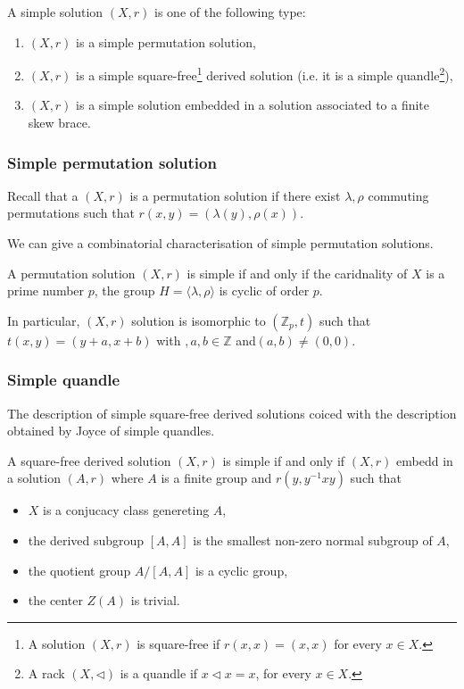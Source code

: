 \begin{theorem}
    A simple solution $(X,r)$ is one of the following type:
    \begin{enumerate}
        \item $(X,r)$ is a simple permutation solution,
        \item $(X,r)$ is a simple square-free\footnote{A solution $(X,r)$ is square-free if $r(x,x)=(x,x)$ for every $x\in X$.} derived solution (i.e. it is a simple quandle\footnote{A rack $(X,\triangleleft)$ is a quandle if $x\triangleleft x = x$, for every $x\in X$.}),
        \item $(X,r)$ is a simple solution embedded in a solution associated to a finite skew brace. 
    \end{enumerate}
\end{theorem}

\subsubsection{Simple permutation solution}

Recall that a $(X,r)$ is a permutation solution if there exist $\lambda,\rho$ commuting permutations such that $r(x,y)=(\lambda(y),\rho(x))$.

We can give a combinatorial characterisation of simple permutation solutions.

\begin{proposition}
    A permutation solution $(X,r)$ is simple if and only if the caridnality of $X$ is a prime number $p$, the group $H=\langle\lambda,\rho\rangle$ is cyclic of order $p$.

    In particular, $(X,r)$ solution is isomorphic to $(\mathbb{Z}_p,t)$ such that $t(x,y)= (y+a,x+b)$ with $,a,b\in \mathbb{Z}$ and$(a,b)\neq (0,0)$.
\end{proposition}

\subsubsection{Simple quandle}

The description of simple square-free derived solutions coiced with the description obtained by Joyce of simple quandles. 

\begin{proposition}
    A square-free derived solution $(X,r)$ is simple if and only if $(X,r)$ embedd in a solution $(A,r)$ where $A$ is a finite group and $r(y, y^{-1}xy)$ such that
    \begin{itemize}
        \item $X$ is a conjucacy class genereting $A$,
        \item the derived subgroup $[A,A]$ is the smallest non-zero normal subgroup of $A$,
        \item the quotient group $A/[A,A]$ is a cyclic group,
        \item the center $Z(A)$ is trivial.
    \end{itemize}
\end{proposition}

